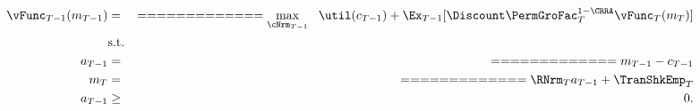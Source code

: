 \begin{equation*}\begin{gathered}\begin{aligned}
{\vFunc}_{T-1}({m}_{T-1})              & = &  =  =  =  =  =  =  =  =  =  =  =  =  = \max_{\cNrm_{T-1}} ~~ \util({c}_{T-1}) + \Ex_{T-1} [\Discount \PermGroFac_{T}^{1-\CRRA}{\vFunc}_{T}({m}_{T})] \label{eq:ConstrArt}
\\ & \mbox{s.t.}&  \nonumber
\\ {a}_{T-1}              & = &  =  =  =  =  =  =  =  =  =  =  =  =  = {m}_{T-1} - {c}_{T-1}
\\ {m}_{T}              & = &  =  =  =  =  =  =  =  =  =  =  =  =  = \RNrm_{T} {a}_{T-1} + \TranShkEmp_{T}
\\ {a}_{T-1} & \geq & 0 .
\end{aligned}\end{gathered}\end{equation*}
